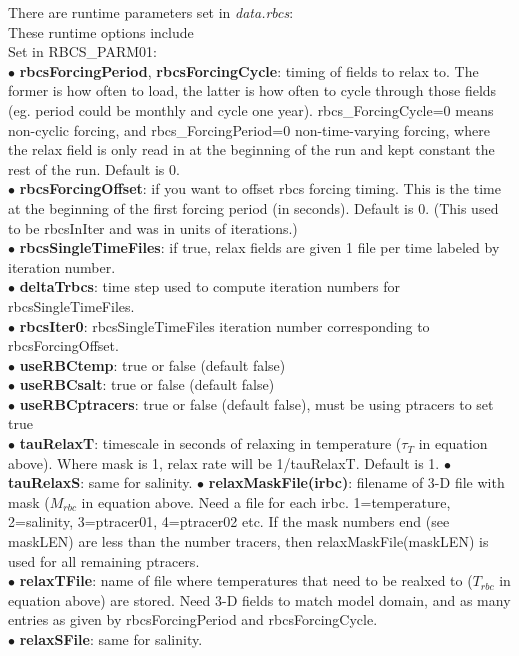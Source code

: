 \noindent
There are runtime parameters
set in {\it data.rbcs}:\\
These runtime options include\\
Set in {RBCS\_PARM01}:\\
$\bullet$ {\bf rbcsForcingPeriod}, {\bf rbcsForcingCycle}: timing of
fields to relax to.
The former is how often to load, the latter is how often to cycle
through those fields (eg. period could be monthly and cycle one year).
rbcs\_ForcingCycle=0 means non-cyclic forcing, and
rbcs\_ForcingPeriod=0 non-time-varying forcing, where the relax field
is only read in at the beginning of the run and kept constant
the rest of the run. Default is 0.
\\
$\bullet$  {\bf rbcsForcingOffset}: if you want to offset rbcs forcing
timing. This is the time at the beginning of the first forcing period
(in seconds).  Default is 0.  (This used to be rbcsInIter and was in
units of iterations.)\\
$\bullet$  {\bf rbcsSingleTimeFiles}: if true, relax fields are given
1 file per time labeled by iteration number.\\
$\bullet$  {\bf deltaTrbcs}: time step used to compute iteration numbers 
for rbcsSingleTimeFiles.\\
$\bullet$  {\bf rbcsIter0}: rbcsSingleTimeFiles iteration number
corresponding to rbcsForcingOffset.\\
$\bullet$  {\bf useRBCtemp}: true or false (default false)\\
$\bullet$  {\bf useRBCsalt}: true or false (default false)\\
$\bullet$  {\bf useRBCptracers}: true or false (default false), must be using
ptracers to set true\\
$\bullet$  {\bf tauRelaxT}: timescale in seconds of relaxing
in temperature ($\tau_T$ in equation above). 
Where mask is 1, relax rate will be
1/tauRelaxT. Default is 1.
$\bullet$  {\bf tauRelaxS}: same for salinity.
$\bullet$  {\bf relaxMaskFile(irbc)}: filename of 3-D file
with mask ($M_{rbc}$ in equation above. 
Need a file for each irbc. 1=temperature,
2=salinity, 3=ptracer01, 4=ptracer02 etc. If the mask numbers
end (see maskLEN) are less than the number tracers, then
relaxMaskFile(maskLEN) is used for all remaining ptracers.\\
$\bullet$  {\bf relaxTFile}: name of file where temperatures
that need to be realxed to ($T_{rbc}$ in equation above)
are stored. Need 3-D fields to
match model domain, and as many entries as given by
rbcsForcingPeriod and rbcsForcingCycle.\\
$\bullet$  {\bf relaxSFile}: same for salinity.\\

